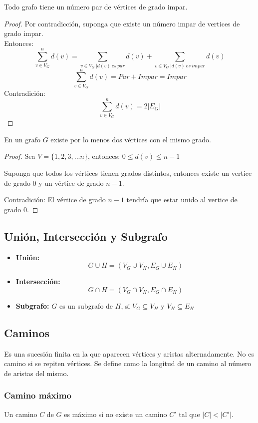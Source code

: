 \begin{teorema}
Todo grafo tiene un número par de vértices de grado impar.
\end{teorema}
\begin{proof}
Por contradicción, suponga que existe un número impar de vertices de grado impar.\\
Entonces: \\
$$\sum_{v\in {V_G}}^n{d(v)} = \sum_{v\in {V_G}\ | d(v)\ es\ par}{d(v)}+\sum_{v\in {V_G}\ | d(v)\ es\ impar}{d(v)}$$
$$\sum_{v\in {V_G}}^n{d(v)} = Par + Impar =Impar$$
Contradición:
$$\sum_{v\in {V_G}}^n{d(v)} = 2|E_G|$$
\end{proof}
\begin{teorema}
En un grafo $G$ existe por lo menos dos vértices con el mismo grado.
\end{teorema}
\begin{proof}
Sea $V=\{1,2,3,...n\}$, entonces: $0\leq d(v)\leq n-1$

Suponga que todos los vértices tienen grados distintos, entonces existe un vertice de grado $0$ y un vértice de grado $n-1$.

Contradición: El vértice de grado $n-1$ tendría que estar unido al vertice de grado $0$.
\end{proof}
\subsection{Unión, Intersección y Subgrafo}
\begin{itemize}
\item {\bf Unión:}
$$G \cup H = (V_G \cup V_H, E_G \cup E_H)$$
\item {\bf Intersección:}
$$G \cap H = (V_G \cap V_H, E_G \cap E_H)$$
\item {\bf Subgrafo:} $G$ es un subgrafo de $H$, si $V_G \subseteq V_H$ y
$V_H \subseteq E_H$
\end{itemize}

\subsection{Caminos}

Es una sucesión finita en la que aparecen vértices y aristas alternadamente.
No es camino si se repiten vértices. Se define como la longitud de un camino al número de aristas del mismo.

\subsubsection{Camino máximo}
Un camino $C$ de $G$ es máximo si no existe un camino $C'$ tal que $|C|<|C'|$.

